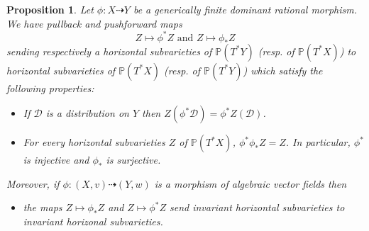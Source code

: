 \documentclass[12pt]{amsart}
\renewcommand{\P}{\mathbb{P}}
\theoremstyle{definition}
\theoremstyle{plain}
\newtheorem{proposition}[definition]{Proposition}
\theoremstyle{exampstyle}
\theoremstyle{exampstyle}\newtheorem{thmxbis}{Theorem}
\numberwithin{equation}{section}
\theoremstyle{remark}
\begin{document}
 
\begin{proposition} \label{proposition-pull-back-push forward}
Let $\phi: X \dashrightarrow Y$ be a generically finite dominant rational morphism. We have pullback and pushforward  maps
$$ Z \mapsto \phi^\ast Z \text{ and } Z \mapsto \phi_\ast Z  $$ 
sending respectively a horizontal subvarieties of $\P(T^\ast Y)$ (resp. of $\P(T^\ast X)$) to horizontal subvarieties of $\P(T^\ast X)$ (resp. of $\P(T^\ast Y)$) which satisfy the following properties: 
\begin{itemize} 
\item[(i)] If $\mathcal D$ is a distribution on $Y$ then $Z(\phi^\ast \mathcal D) = \phi^\ast Z(\mathcal D)$.

\item[(ii)] For every horizontal subvarieties $Z$ of $\P(T^\ast X)$, $\phi^\ast \phi_\ast Z = Z$.
In particular, $\phi^\ast$ is injective and $\phi_\ast$ is surjective. 

\end{itemize} 
Moreover, if $\phi: (X,v) \dashrightarrow (Y,w)$ is a morphism of algebraic vector fields then 
\begin{itemize} 
\item[(iii)] the maps $Z \mapsto \phi_\ast Z$ and $Z \mapsto \phi^\ast Z$ send invariant horizontal subvarieties to invariant horizonal subvarieties. 
\end{itemize} 
\end{proposition} 
\end{document}

